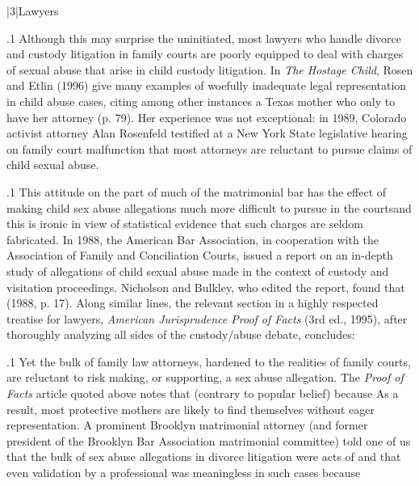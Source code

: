 \documentclass[11pt, twoside]{article}
\begin{document}
{\s|3|{Lawyers}

\p.1{%
\noindent{}\:Although this may surprise the uninitiated, most lawyers who handle divorce and custody litigation in family courts are poorly equipped to deal
with charges of sexual abuse that arise in child custody litigation.
In \textit{The Hostage Child}, Rosen and Etlin (1996) give many examples of woefully
inadequate legal representation in child abuse cases, citing among other
instances a Texas mother who  only to have her attorney  (p. 79). Her experience was not exceptional: in 1989,
Colorado activist attorney Alan Rosenfeld testified at a New York State
legislative hearing on family court malfunction that most attorneys are
reluctant to pursue claims of child sexual abuse.\;
}%

\p.1{%
\:This attitude on the part of much of the matrimonial bar has the effect of making child sex abuse allegations much more difficult to pursue
in the courts\mdash{}and this is ironic in view of statistical evidence that such
charges are seldom fabricated. In 1988, the American Bar Association,
in cooperation with the Association of Family and Conciliation Courts,
issued a report on an in-depth study of allegations of child sexual abuse
made in the context of custody and visitation proceedings. Nicholson
and Bulkley, who edited the report, found that  (1988, p. 17). Along similar lines, the relevant section in a
highly respected treatise for lawyers,
\textit{American Jurisprudence Proof of
Facts} (3rd ed., 1995), after thoroughly analyzing all sides of the custody/abuse debate, concludes: \;
}%

\p.1{%
\:Yet the bulk of family law attorneys, hardened to the realities of family
courts, are reluctant to risk making, or supporting, a sex abuse allegation.
The \textit{Proof of Facts} article quoted above notes that  (contrary to
popular belief) because  As a result,
most protective mothers are likely to find themselves without eager representation. A prominent Brooklyn matrimonial attorney (and former
president of the Brooklyn Bar Association matrimonial committee) told
one of us that the bulk of sex abuse allegations in divorce litigation were
acts of  and that even validation by a professional was meaningless in such cases because \;
}%

}
\end{document}
